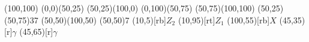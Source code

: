 \begin{axopicture}(100,100)
	\Line[arrow](0,0)(50,25)
	\Line[arrow](50,25)(100,0)
	\Line[arrow](0,100)(50,75)
	\Line[arrow](50,75)(100,100)
	\Photon(50,25)(50,75){3}{7}
	(50,50)(100,50)
	\BCirc(50,50){7}
	\Text(10,5)[rb]{$Z_2$}
	\Text(10,95)[rt]{$Z_1$}
	\Text(100,55)[rb]{$X$}
	\Text(45,35)[r]{$\gamma$}
	\Text(45,65)[r]{$\gamma$}
\end{axopicture}

